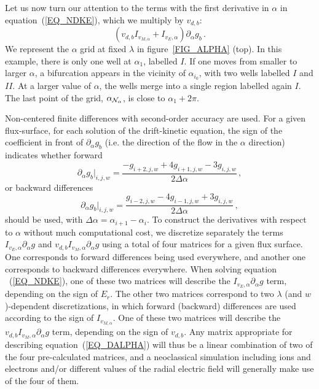 Let us now turn our attention to the terms with the first derivative in $\alpha$ in equation~(\ref{EQ_NDKE}), which we multiply by $v_{d,b}$:
\begin{equation}
\left(v_{d,b}I_{v_{M,\alpha}} +I_{v_E,\alpha}\right)\partial_\alpha g_b\,. 
\label{EQ_DALPHA}
\end{equation}
We represent the $\alpha$ grid at fixed $\lambda$ in figure~\ref{FIG_ALPHA} (top). In this example, there is only one well at $\alpha_1$, labelled $I$. If one moves from smaller to larger $\alpha$, a bifurcation appears in the vicinity of $\alpha_{i_0}$, with two wells labelled $I$ and $II$. At a larger value of $\alpha$, the wells merge into a single region labelled again $I$. The last point of the grid, $\alpha_{{\cal{N}}_\alpha}$, is close to $\alpha_1+2\pi$.

Non-centered finite differences with second-order accuracy are used. For a given flux-surface, for each solution of the drift-kinetic equation, the sign of the coefficient in front of $\partial_\alpha g_b$ (i.e. the direction of the flow in the $\alpha$ direction) indicates whether forward
\begin{equation}
\partial_\alpha g_b|_{i,j,w}=\frac{-g_{i+2,j,w}+4g_{i+1,j,w}-3g_{i,j,w}}{2\Delta\alpha}\,,
\label{EQ_FDALPHA}
\end{equation}
 or backward differences 
 \begin{equation}
\partial_\alpha g_b|_{i,j,w}=\frac{g_{i-2,j,w}-4g_{i-1,j,w}+3g_{i,j,w}}{2\Delta\alpha}\,,
\label{EQ_BDALPHA}
\end{equation}
should be used, with $\Delta\alpha=\alpha_{i+1}-\alpha_i$. To construct the derivatives with respect to $\alpha$ without much computational cost, we discretize separately the terms $I_{v_E,\alpha}\partial_\alpha g$ and $v_{d,b}I_{v_M,\alpha}\partial_\alpha g$ using a total of four matrices for a given flux surface. One corresponds to forward differences being used everywhere, and another one corresponds to backward differences everywhere. When solving equation ~(\ref{EQ_NDKE}), one of these two matrices will describe the $I_{v_E,\alpha}\partial_\alpha g$ term, depending on the sign of $E_r$. The other two matrices correspond to two $\lambda$ (and $w$)-dependent discretizations, in which forward (backward) differences are used according to the sign of $I_{v_{M,\alpha}}$. One of these two matrices will describe the $v_{d,b}I_{v_M,\alpha}\partial_\alpha g$ term, depending on the sign of $v_{d,b}$. Any matrix appropriate for describing equation~(\ref{EQ_DALPHA}) will thus be a linear combination of two of the four pre-calculated matrices, and a neoclassical simulation including ions and electrons and/or different values of the radial electric field will generally make use of the four of them.

